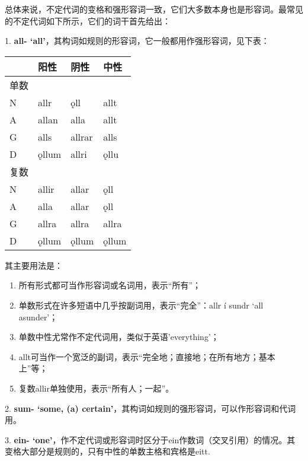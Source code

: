 总体来说，不定代词的变格和强形容词一致，它们大多数本身也是形容词。最常见的不定代词如下所示，它们的词干首先给出：

1. \textbf{all-
  `all‌'}，其构词如规则的形容词，它一般都用作强形容词，见下表：

\begin{longtable}{llll}
  \toprule
     & 阳性    & 阴性     & 中性    \\
  \midrule
  \endhead
  \bottomrule
  \endfoot
  单数 &       &        &       \\
  N  & allr  & ǫll    & allt  \\
  A  & allan & alla   & allt  \\
  G  & alls  & allrar & alls  \\
  D  & ǫllum & allri  & ǫllu  \\
  复数 &       &        &       \\
  N  & allir & allar  & ǫll   \\
  A  & alla  & allar  & ǫll   \\
  G  & allra & allra  & allra \\
  D  & ǫllum & ǫllum  & ǫllum \\
\end{longtable}

其主要用法是：

\begin{enumerate}
  \def\labelenumi{\Alph{enumi}.}
  \item
        所有形式都可当作形容词或名词用，表示``所有''；
  \item
        单数形式在许多短语中几乎按副词用，表示``完全''：allr í sundr `all
        asunder'；
  \item
        单数中性尤常作不定代词用，类似于英语'everything'；
  \item
        allt可当作一个宽泛的副词，表示``完全地；直接地；在所有地方；基本上''等；
  \item
        复数allir单独使用，表示``所有人；一起''。
\end{enumerate}

2. \textbf{sum- `some, (a)
  certain‌'}，其构词如规则的强形容词，可以作形容词和代词用。

3. \textbf{ein-
  `one‌'}，作不定代词或形容词时区分于ein作数词（交叉引用）的情况。其变格大部分是规则的，只有中性的单数主格和宾格是eitt.

